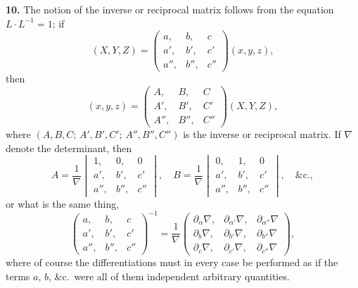 \documentclass[12pt,a4paper]{article}
\theoremstyle{definition}
\begin{document}
\medskip
\noindent\textbf{10.} The notion of the inverse or reciprocal matrix follows from the equation $L \cdot L^{-1} = 1$; if
\[
(X,Y,Z) = \begin{pmatrix} a, & b, & c \\ a', & b', & c' \\ a'', & b'', & c'' \end{pmatrix}(x,y,z),
\]
then
\[
(x,y,z) = \begin{pmatrix} A, & B, & C \\ A', & B', & C' \\ A'', & B'', & C'' \end{pmatrix}(X,Y,Z),
\]
where $(A,B,C;\, A',B',C';\, A'',B'',C'')$ is the inverse or reciprocal matrix. If $\nabla$ denote the determinant, then
\[
A = \frac{1}{\nabla}\begin{vmatrix} 1, & 0, & 0 \\ a', & b', & c' \\ a'', & b'', & c'' \end{vmatrix},\quad
B = \frac{1}{\nabla}\begin{vmatrix} 0, & 1, & 0 \\ a', & b', & c' \\ a'', & b'', & c'' \end{vmatrix},\quad \&\text{c.},
\]
or what is the same thing,
\[
\begin{pmatrix} a, & b, & c \\ a', & b', & c' \\ a'', & b'', & c'' \end{pmatrix}^{-1}
= \frac{1}{\nabla}
\begin{pmatrix}
\partial_\alpha \nabla, & \partial_{\alpha'} \nabla, & \partial_{\alpha''} \nabla \\
\partial_b \nabla, & \partial_{b'} \nabla, & \partial_{b''} \nabla \\
\partial_c \nabla, & \partial_{c'} \nabla, & \partial_{c''} \nabla
\end{pmatrix},
\]
where of course the differentiations must in every case be performed as if the terms $a$, $b$, \&c.\ were all of them independent arbitrary quantities.

\newpage
\end{document}
